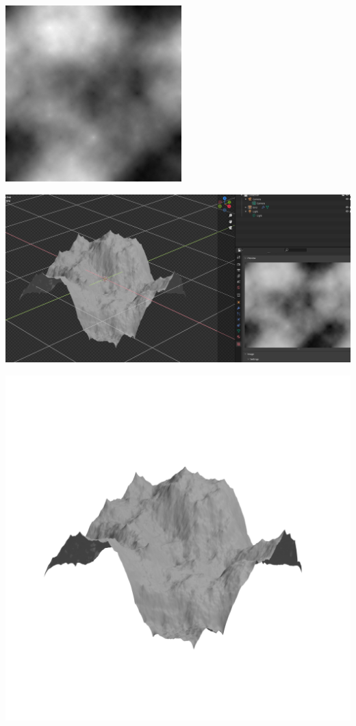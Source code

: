 \documentclass[11pt,class=report,crop=false]{standalone}
\begin{document}
\begin{exemple}
\begin{center}
\begin{minipage}{0.4\textwidth}
\includegraphics[scale=\myscale,scale=0.5]{figures/hauteurs-03}
\end{minipage}
\begin{minipage}{0.5\textwidth}
\includegraphics[scale=\myscale,scale=0.15]{figures/hauteurs-capture-new-02}
\end{minipage}

\smallskip

\includegraphics[scale=\myscale,scale=0.25]{figures/hauteurs-render-new-01}


\end{center}
\end{exemple}
\end{document}
